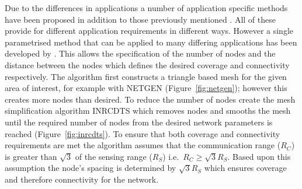 \documentclass[authoryearcitations]{UoYCSproject}
\begin{document}
Due to the differences in applications a number of application specific methods have been proposed in addition to those previously mentioned \citep{Meguerdichian2001,Meguerdichian2001a,Meguerdichian2003}. All of these provide for different application requirements in different ways. However a single parametrised method that can be applied to many differing applications has been developed by \citet*{Derr2013}. This allows the specification of the number of nodes and the distance between the nodes which defines the desired coverage and connectivity respectively. The algorithm first constructs a triangle based mesh for the given area of interest, for example with NETGEN (Figure~\ref{fig:netgen}); however this creates more nodes than desired. To reduce the number of nodes \citeauthor*{Derr2013} create the mesh simplification algorithm INRCDTS which removes nodes and smooths the mesh until the required number of nodes from the desired network parameters is reached (Figure~\ref{fig:inrcdts}). To ensure that both coverage and connectivity requirements are met the algorithm assumes that the communication range ($R_C$) is greater than $\sqrt{3}$ of the sensing range ($R_S$) i.e.\ $R_C \ge \sqrt{3} R_S$. Based upon this assumption the node's spacing is determined by $\sqrt{3} R_S$ which ensures coverage and therefore connectivity for the network.
\end{document}
